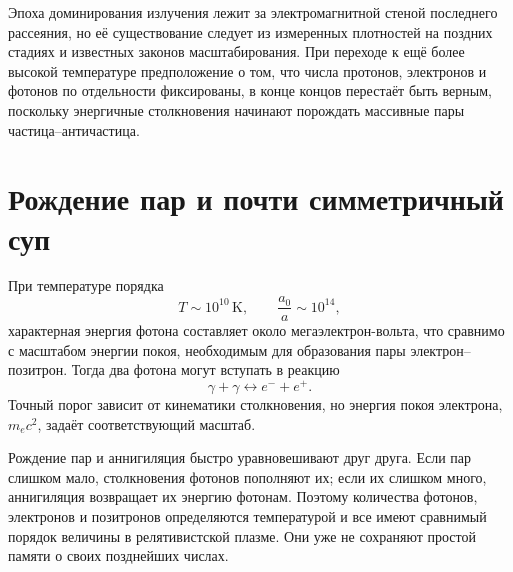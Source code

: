 Эпоха доминирования излучения лежит за электромагнитной стеной последнего рассеяния, но её существование следует из измеренных плотностей на поздних стадиях и известных законов масштабирования. При переходе к ещё более высокой температуре предположение о том, что числа протонов, электронов и фотонов по отдельности фиксированы, в конце концов перестаёт быть верным, поскольку энергичные столкновения начинают порождать массивные пары частица--античастица.

\begin{classroomqa}
\end{classroomqa}

\section{Рождение пар и почти симметричный суп}

При температуре порядка
\begin{equation}
T\sim10^{10}\,\mathrm{K},
\qquad
\frac{a_0}{a}\sim10^{14},
\end{equation}
характерная энергия фотона составляет около мегаэлектрон-вольта, что сравнимо с масштабом энергии покоя, необходимым для образования пары электрон--позитрон. Тогда два фотона могут вступать в реакцию
\begin{equation}
\gamma+\gamma
\longleftrightarrow
e^-+e^+.
\label{eq:c07-pair-reaction}
\end{equation}
Точный порог зависит от кинематики столкновения, но энергия покоя электрона, \(m_ec^2\), задаёт соответствующий масштаб.

Рождение пар и аннигиляция быстро уравновешивают друг друга. Если пар слишком мало, столкновения фотонов пополняют их; если их слишком много, аннигиляция возвращает их энергию фотонам. Поэтому количества фотонов, электронов и позитронов определяются температурой и все имеют сравнимый порядок величины в релятивистской плазме. Они уже не сохраняют простой памяти о своих позднейших числах.

